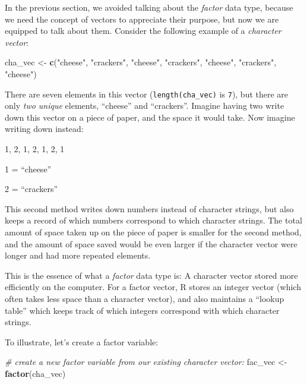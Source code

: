 \documentclass[
]{article}
\newenvironment{Shaded}{\begin{snugshade}}{\end{snugshade}}
\newcommand{\CommentTok}[1]{\textcolor[rgb]{0.56,0.35,0.01}{\textit{#1}}}
\newcommand{\KeywordTok}[1]{\textcolor[rgb]{0.13,0.29,0.53}{\textbf{#1}}}
\newcommand{\NormalTok}[1]{#1}
\newcommand{\StringTok}[1]{\textcolor[rgb]{0.31,0.60,0.02}{#1}}
\begin{document}
In the previous section, we avoided talking about the \emph{factor} data type, because we need the concept of vectors to appreciate their purpose, but now we are equipped to talk about them.
Consider the following example of a \emph{character vector}:

\begin{Shaded}
\begin{Highlighting}[]
\NormalTok{cha_vec <-}\StringTok{ }\KeywordTok{c}\NormalTok{(}\StringTok{"cheese"}\NormalTok{, }\StringTok{"crackers"}\NormalTok{, }\StringTok{"cheese"}\NormalTok{, }\StringTok{"crackers"}\NormalTok{, }\StringTok{"cheese"}\NormalTok{, }\StringTok{"crackers"}\NormalTok{, }\StringTok{"cheese"}\NormalTok{)}
\end{Highlighting}
\end{Shaded}

There are seven elements in this vector (\texttt{length(cha\_vec)} is \texttt{7}), but there are only \emph{two unique} elements, ``cheese'' and ``crackers''.
Imagine having two write down this vector on a piece of paper, and the space it would take.
Now imagine writing down instead:

1, 2, 1, 2, 1, 2, 1

1 = ``cheese''

2 = ``crackers''

This second method writes down numbers instead of character strings, but also keeps a record of which numbers correspond to which character strings.
The total amount of space taken up on the piece of paper is smaller for the second method, and the amount of space saved would be even larger if the character vector were longer and had more repeated elements.

This is the essence of what a \emph{factor} data type is: A character vector stored more efficiently on the computer.
For a factor vector, R stores an integer vector (which often takes less space than a character vector), and also maintains a ``lookup table'' which keeps track of which integers correspond with which character strings.

To illustrate, let's create a factor variable:

\begin{Shaded}
\begin{Highlighting}[]
\CommentTok{# create a new factor variable from our existing character vector:}
\NormalTok{fac_vec <-}\StringTok{ }\KeywordTok{factor}\NormalTok{(cha_vec)   }
\end{Highlighting}
\end{Shaded}
\end{document}
